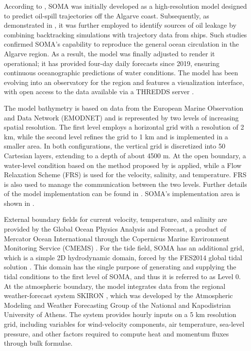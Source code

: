 According to \textcite{janeiro2012towards}, SOMA was initially developed as a high-resolution model designed to predict oil-spill trajectories off the Algarve coast. Subsequently, as demonstrated in \textcite{janeiro2017integrating}, it was further employed to identify sources of oil leakage by combining backtracking simulations with trajectory data from ships. Such studies confirmed SOMA's capability to reproduce the general ocean circulation in the Algarve region. As a result, the model was finally adjusted to render it operational; it has provided four-day daily forecasts since 2019, ensuring continuous oceanographic predictions of water conditions. The model has been evolving into an observatory for the region and features a visualization interface, with open access to the data available via a THREDDS server \parencite{cima2024soma}.

The model bathymetry is based on data from the European Marine Observation and Data Network (EMODNET) and is represented by two levels of increasing spatial resolution. The first level employs a horizontal grid with a resolution of 2 km, while the second level refines the grid to 1 km and is implemented in a smaller area. In both configurations, the vertical grid is discretized into 50 Cartesian layers, extending to a depth of about 4500 m. At the open boundary, a water-level condition based on the method proposed by \textcite{blumberg1985open} is applied, while a Flow Relaxation Scheme (FRS) \parencite{martinsen1987implementation} is used for the velocity, salinity, and temperature. FRS is also used to manage the communication between the two levels. Further details of the model implementation can be found in \textcite{janeiro2017integrating}. SOMA's implementation area is shown in .

External boundary fields for current velocity, temperature, and salinity are provided by the Global Ocean Physics Analysis and Forecast, a product of Mercator Ocean International through the Copernicus Marine Environment Monitoring Service (CMEMS) \parencite{cmems2016mercator}. For the tide field, SOMA has an additional grid, which is a simple 2D hydrodynamic domain, forced by the FES2014 global tidal solution \parencite{carrere2013fes}. This domain has the single purpose of generating and supplying the tidal conditions to the first level of SOMA, and thus it is referred to as Level 0. At the atmospheric boundary, the model integrates data from the regional weather-forecast system SKIRON \parencite{kallos1997regional, papadopoulos2002weather}, which was developed by the Atmospheric Modeling and Weather Forecasting Group of the National and Kapodistrian University of Athens. The system provides hourly inputs on a 5 km resolution grid, including variables for wind-velocity components, air temperature, sea-level pressure, and other factors required to compute heat and momentum fluxes through bulk formulae.

